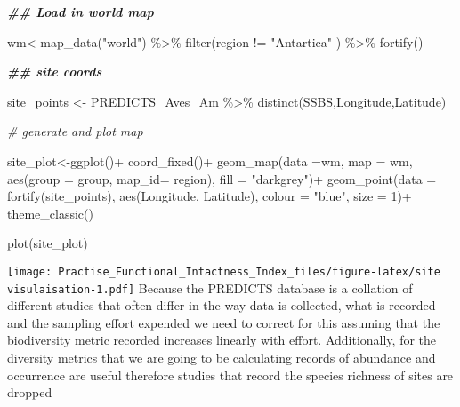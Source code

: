 \documentclass[
]{article}
\newenvironment{Shaded}{\begin{snugshade}}{\end{snugshade}}
\newcommand{\AttributeTok}[1]{\textcolor[rgb]{0.77,0.63,0.00}{#1}}
\newcommand{\CommentTok}[1]{\textcolor[rgb]{0.56,0.35,0.01}{\textit{#1}}}
\newcommand{\DecValTok}[1]{\textcolor[rgb]{0.00,0.00,0.81}{#1}}
\newcommand{\DocumentationTok}[1]{\textcolor[rgb]{0.56,0.35,0.01}{\textbf{\textit{#1}}}}
\newcommand{\FunctionTok}[1]{\textcolor[rgb]{0.00,0.00,0.00}{#1}}
\newcommand{\NormalTok}[1]{#1}
\newcommand{\OtherTok}[1]{\textcolor[rgb]{0.56,0.35,0.01}{#1}}
\newcommand{\SpecialCharTok}[1]{\textcolor[rgb]{0.00,0.00,0.00}{#1}}
\newcommand{\StringTok}[1]{\textcolor[rgb]{0.31,0.60,0.02}{#1}}
\begin{document}
\begin{Shaded}
\begin{Highlighting}[]
\DocumentationTok{\#\# Load in world map}

\NormalTok{wm}\OtherTok{\textless{}{-}}\FunctionTok{map\_data}\NormalTok{(}\StringTok{"world"}\NormalTok{) }\SpecialCharTok{\%\textgreater{}\%} \FunctionTok{filter}\NormalTok{(region }\SpecialCharTok{!=} \StringTok{"Antartica"}\NormalTok{ ) }\SpecialCharTok{\%\textgreater{}\%} \FunctionTok{fortify}\NormalTok{()}

\DocumentationTok{\#\# site coords}

\NormalTok{site\_points }\OtherTok{\textless{}{-}}\NormalTok{ PREDICTS\_Aves\_Am }\SpecialCharTok{\%\textgreater{}\%} \FunctionTok{distinct}\NormalTok{(SSBS,Longitude,Latitude)}

\CommentTok{\# generate and plot map}

\NormalTok{site\_plot}\OtherTok{\textless{}{-}}\FunctionTok{ggplot}\NormalTok{()}\SpecialCharTok{+} \FunctionTok{coord\_fixed}\NormalTok{()}\SpecialCharTok{+}
  \FunctionTok{geom\_map}\NormalTok{(}\AttributeTok{data =}\NormalTok{wm, }\AttributeTok{map =}\NormalTok{ wm,}
           \FunctionTok{aes}\NormalTok{(}\AttributeTok{group =}\NormalTok{ group, }\AttributeTok{map\_id=}\NormalTok{ region),}
           \AttributeTok{fill =} \StringTok{"darkgrey"}\NormalTok{)}\SpecialCharTok{+}
  \FunctionTok{geom\_point}\NormalTok{(}\AttributeTok{data =} \FunctionTok{fortify}\NormalTok{(site\_points), }\FunctionTok{aes}\NormalTok{(Longitude, Latitude),}
             \AttributeTok{colour =} \StringTok{"blue"}\NormalTok{, }\AttributeTok{size =} \DecValTok{1}\NormalTok{)}\SpecialCharTok{+}
  \FunctionTok{theme\_classic}\NormalTok{()}

\FunctionTok{plot}\NormalTok{(site\_plot)}
\end{Highlighting}
\end{Shaded}

\texttt{[image: Practise\_Functional\_Intactness\_Index\_files/figure-latex/site visulaisation-1.pdf]}
Because the PREDICTS database is a collation of different studies that
often differ in the way data is collected, what is recorded and the
sampling effort expended we need to correct for this assuming that the
biodiversity metric recorded increases linearly with effort.
Additionally, for the diversity metrics that we are going to be
calculating records of abundance and occurrence are useful therefore
studies that record the species richness of sites are dropped
\end{document}
